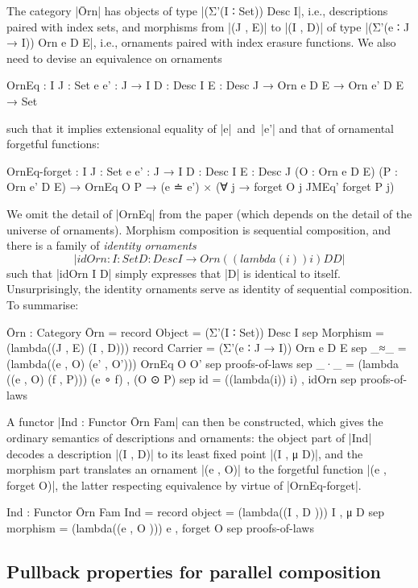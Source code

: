 The category |Ōrn| has objects of type |(Σ'(I ∶ Set)) Desc I|, i.e., descriptions paired with index sets, and morphisms from |(J , E)| to |(I , D)| of type |(Σ'(e ∶ J → I)) Orn e D E|, i.e., ornaments paired with index erasure functions.
We also need to devise an equivalence on ornaments
\begin{code}
OrnEq :
  {I J : Set} {e e' : J → I} {D : Desc I} {E : Desc J} →
  Orn e D E → Orn e' D E → Set
\end{code}
such that it implies extensional equality of |e|~and~|e'| and that of ornamental forgetful functions:
\begin{code}
OrnEq-forget :
  {I J : Set} {e e' : J → I} {D : Desc I} {E : Desc J}
  (O : Orn e D E) (P : Orn e' D E) → OrnEq O P →
  (e ≐ e') × (∀ {j} → forget O {j} JMEq' forget P {j})
\end{code}
We omit the detail of |OrnEq| from the paper (which depends on the detail of the universe of ornaments).
Morphism composition is sequential composition, and there is a family of \emph{identity ornaments}
\[ |idOrn : {I : Set} {D : Desc I} → Orn ((lambda(i)) i) D D| \]
such that |idOrn {I} {D}| simply expresses that |D| is identical to itself.
Unsurprisingly, the identity ornaments serve as identity of sequential composition.
To summarise:
\begin{code}
Ōrn : Category
Ōrn = record
  {    Object    =  (Σ'(I ∶ Set)) Desc I
  sep  Morphism  =
         (lambda((J , E) (I , D))) record
           {    Carrier  =  (Σ'(e ∶ J → I)) Orn e D E
           sep  _≈_      =  (lambda((e , O) (e' , O'))) OrnEq O O'
           sep  proofs-of-laws }
  sep  _·_  =  (lambda ((e , O) (f , P))) (e ∘ f) , (O ⊙ P)
  sep  id   =  ((lambda(i)) i) , idOrn
  sep  proofs-of-laws }
\end{code}
A functor |Ind : Functor Ōrn Fam| can then be constructed, which gives the ordinary semantics of descriptions and ornaments: the object part of |Ind| decodes a description |(I , D)| to its least fixed point |(I , μ D)|, and the morphism part translates an ornament |(e , O)| to the forgetful function |(e , forget O)|, the latter respecting equivalence by virtue of |OrnEq-forget|.
\begin{code}
Ind : Functor Ōrn Fam
Ind = record  {    object    =  (lambda((I , D  ))) I , μ D
              sep  morphism  =  (lambda((e , O  ))) e , forget O
              sep  proofs-of-laws }
\end{code}

\subsection{Pullback properties for parallel composition}
\label{sec:pullback-properties}

